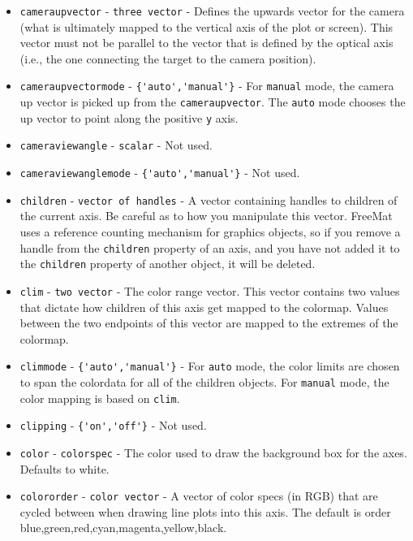 \begin{itemize}
\item  \verb|cameraupvector| - \verb|three vector| - Defines the upwards vector
 for the camera (what is ultimately mapped to the vertical axis of the
 plot or screen).  This vector must not be parallel to the vector that
 is defined by the optical axis (i.e., the one connecting the target to the
 camera position).

\item  \verb|cameraupvectormode| - \verb|{'auto','manual'}| - For \verb|manual|
 mode, the camera up vector is picked up from the \verb|cameraupvector|.  The
 \verb|auto| mode chooses the up vector to point along the positive \verb|y| axis.

\item  \verb|cameraviewangle| - \verb|scalar| - Not used.

\item  \verb|cameraviewanglemode| - \verb|{'auto','manual'}| - Not used.

\item  \verb|children| - \verb|vector of handles| - A vector containing handles to
 children of the current axis.  Be careful as to how you manipulate this
 vector.  FreeMat uses a reference counting mechanism for graphics objects,
 so if you remove a handle from the \verb|children| property of an axis, and
 you have not added it to the \verb|children| property of another object, it
 will be deleted.

\item  \verb|clim| - \verb|two vector| - The color range vector.  This vector
 contains two values that dictate how children of this axis get mapped
 to the colormap.  Values between the two endpoints of this vector are mapped
 to the extremes of the colormap.

\item  \verb|climmode| - \verb|{'auto','manual'}| - For \verb|auto| mode, the color limits
 are chosen to span the colordata for all of the children objects.  For \verb|manual|
 mode, the color mapping is based on \verb|clim|.

\item  \verb|clipping| - \verb|{'on','off'}| - Not used.

\item  \verb|color| - \verb|colorspec| - The color used to draw the background box
 for the axes.  Defaults to white.

\item  \verb|colororder| - \verb|color vector| - A vector of color specs (in 
 RGB) that are cycled between when drawing line plots into this axis.
 The default is order blue,green,red,cyan,magenta,yellow,black.


\end{itemize}
